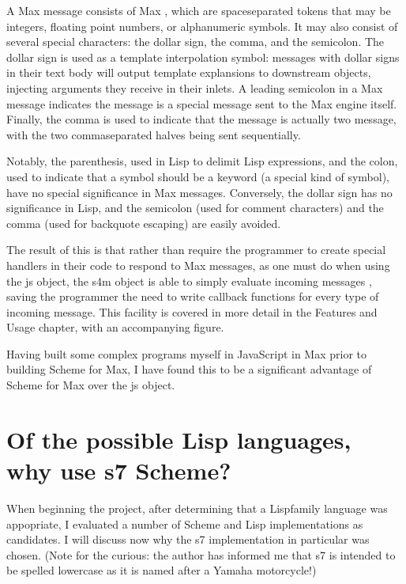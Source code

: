 \documentclass[letterpaper,10pt,english]{sphinxmanual}
\begin{document}
\sphinxAtStartPar
A Max message consists of Max , which are space\sphinxhyphen{}separated tokens that may be integers, floating point numbers, or alpha\sphinxhyphen{}numeric symbols.
It may also consist of several special characters: the dollar sign, the comma, and the semi\sphinxhyphen{}colon.
The dollar sign is used as a template interpolation symbol: messages with dollar signs in their text body will output template
explansions to downstream objects, injecting arguments they receive in their inlets.
A leading semi\sphinxhyphen{}colon in a Max message indicates the message is a special message sent to the Max engine itself.
Finally, the comma is used to indicate that the message is actually two message, with the two comma\sphinxhyphen{}separated halves being sent sequentially.

\sphinxAtStartPar
Notably, the parenthesis, used in Lisp to delimit Lisp expressions, and the colon, used to indicate that a symbol should be a keyword (a special kind of symbol),
have no special significance in Max messages.
Conversely, the dollar sign has no significance in Lisp, and the semi\sphinxhyphen{}colon (used for comment characters) and the comma
(used for back\sphinxhyphen{}quote escaping) are easily avoided.

\sphinxAtStartPar
The result of this is that rather than require the programmer to create special handlers in their code to respond to Max messages,
as one must do when using the js object, the s4m object is able to simply evaluate incoming messages ,
saving the programmer the need to write callback functions for every type of incoming message.
This facility is covered in more detail in the Features and Usage chapter, with an accompanying figure.

\sphinxAtStartPar
Having built some complex programs myself in JavaScript in Max prior to building Scheme for Max,
I have found this to be a significant advantage of Scheme for Max over the js object.


\section{Of the possible Lisp languages, why use s7 Scheme?}
\label{\detokenize{design:of-the-possible-lisp-languages-why-use-s7-scheme}}
\sphinxAtStartPar
When beginning the project, after determining that a Lisp\sphinxhyphen{}family language was appopriate, I evaluated a number of
Scheme and Lisp implementations as candidates.
I will discuss now why the s7 implementation in particular was chosen.
(Note for the curious: the author has informed me that s7 is intended to be spelled lowercase
as it is named after a Yamaha motorcycle!)
\end{document}
